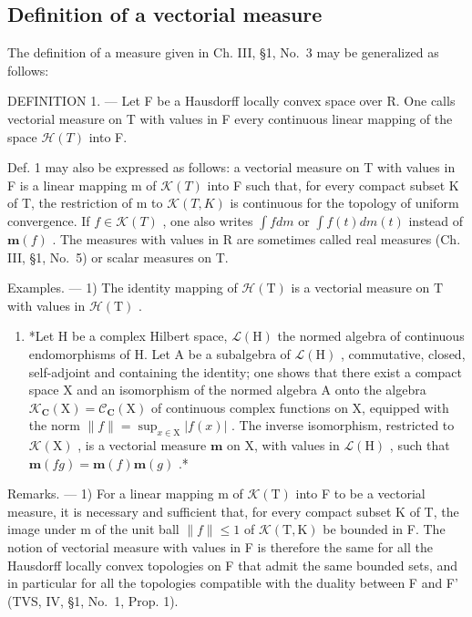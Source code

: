 \subsection{Definition of a vectorial measure}

The definition of a measure given in Ch. III, §1, No.~3 may be generalized as follows:

DEFINITION 1. --- Let F be a Hausdorff locally convex space over R. One calls vectorial measure on T with values in F every continuous linear mapping of the space \(\mathcal{H}(T)\) into F.

Def. 1 may also be expressed as follows: a vectorial measure on T with values in F is a linear mapping m of \(\mathcal{K}(T)\) into F such that, for every compact subset K of T, the restriction of m to \(\mathcal{K}(T,K)\) is continuous for the topology of uniform convergence. If \(f \in \mathcal{K}(T)\) , one also writes \(\int f dm\) or \(\int f(t) dm(t)\) instead of \(\mathbf{m}(f)\) . The measures with values in R are sometimes called real measures (Ch. III, §1, No.~5) or scalar measures on T.

Examples. --- 1) The identity mapping of \(\mathcal{H}(\mathrm{T})\) is a vectorial measure on \(\mathrm{T}\) with values in \(\mathcal{H}(\mathrm{T})\) .

\begin{enumerate}
\def\labelenumi{\arabic{enumi})}
\setcounter{enumi}{1}
\tightlist
\item
  *Let H be a complex Hilbert space, \(\mathcal{L}(\mathrm{H})\) the normed algebra of continuous endomorphisms of H. Let A be a subalgebra of \(\mathcal{L}(\mathrm{H})\) , commutative, closed, self-adjoint and containing the identity; one shows that there exist a compact space X and an isomorphism of the normed algebra A onto the algebra \(\mathcal{K}_{\mathbf{C}}(\mathrm{X}) = \mathcal{C}_{\mathbf{C}}(\mathrm{X})\) of continuous complex functions on X, equipped with the norm \(\| f \| = \sup_{x \in \mathrm{X}} |f(x)|\) . The inverse isomorphism, restricted to \(\mathcal{K}(\mathrm{X})\) , is a vectorial measure \(\mathbf{m}\) on X, with values in \(\mathcal{L}(\mathrm{H})\) , such that \(\mathbf{m}(fg) = \mathbf{m}(f)\mathbf{m}(g)\) .*
\end{enumerate}

Remarks. --- 1) For a linear mapping m of \(\mathcal{K}(\mathrm{T})\) into F to be a vectorial measure, it is necessary and sufficient that, for every compact subset K of T, the image under m of the unit ball \(\|f\|\leqslant1\) of \(\mathcal{K}(\mathrm{T},\mathrm{K})\) be bounded in F. The notion of vectorial measure with values in F is therefore the same for all the Hausdorff locally convex topologies on F that admit the same bounded sets, and in particular for all the topologies compatible with the duality between F and F' (TVS, IV, §1, No.~1, Prop. 1).

